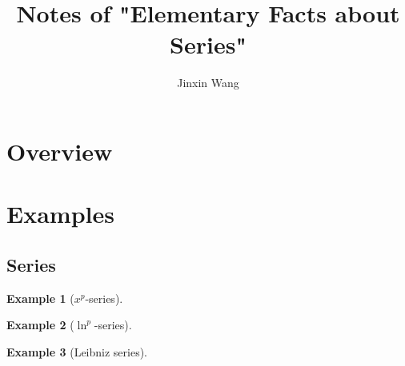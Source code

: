 \documentclass[onecolumn]{ctexart}
\title{Notes of "Elementary Facts about Series"}
\author{Jinxin Wang}
\date{}
\newtheorem{example}{Example}
\begin{document}
\maketitle

\section{Overview}

\section{Examples}

\subsection{Series}

\begin{example}[$x^p$-series]
  
\end{example}

\begin{example}[$\ln^p$-series]
  
\end{example}

\begin{example}[Leibniz series]
  
\end{example}
\end{document}

